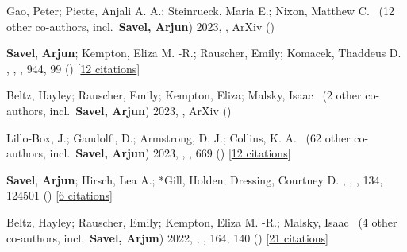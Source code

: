\item[{\color{numcolor}\scriptsize33}] Gao, Peter; Piette, Anjali A. A.; Steinrueck, Maria E.; Nixon, Matthew C. \etal\ ({12} other co-authors, incl.\ \textbf{Savel, Arjun}) 2023, , ArXiv ()

\item[{\color{numcolor}\scriptsize32}] \textbf{Savel}, \textbf{Arjun}; Kempton, Eliza M. -R.; Rauscher, Emily; Komacek, Thaddeus D. , , \apj, {944}, 99 () [\href{https://ui.adsabs.harvard.edu/abs/2023ApJ...944...99S}{12 citations}]

\item[{\color{numcolor}\scriptsize31}] Beltz, Hayley; Rauscher, Emily; Kempton, Eliza; Malsky, Isaac \etal\ ({2} other co-authors, incl.\ \textbf{Savel, Arjun}) 2023, , ArXiv ()

\item[{\color{numcolor}\scriptsize30}] Lillo-Box, J.; Gandolfi, D.; Armstrong, D. J.; Collins, K. A. \etal\ ({62} other co-authors, incl.\ \textbf{Savel, Arjun}) 2023, , \aanda, {669} () [\href{https://ui.adsabs.harvard.edu/abs/2023A&A...669A.109L}{12 citations}]

\item[{\color{numcolor}\scriptsize29}] \textbf{Savel}, \textbf{Arjun}; Hirsch, Lea A.; *Gill, Holden; Dressing, Courtney D. , , \pasp, {134}, 124501 () [\href{https://ui.adsabs.harvard.edu/abs/2022PASP..134l4501S}{6 citations}]

\item[{\color{numcolor}\scriptsize28}] Beltz, Hayley; Rauscher, Emily; Kempton, Eliza M. -R.; Malsky, Isaac \etal\ ({4} other co-authors, incl.\ \textbf{Savel, Arjun}) 2022, , \aj, {164}, 140 () [\href{https://ui.adsabs.harvard.edu/abs/2022AJ....164..140B}{21 citations}]

